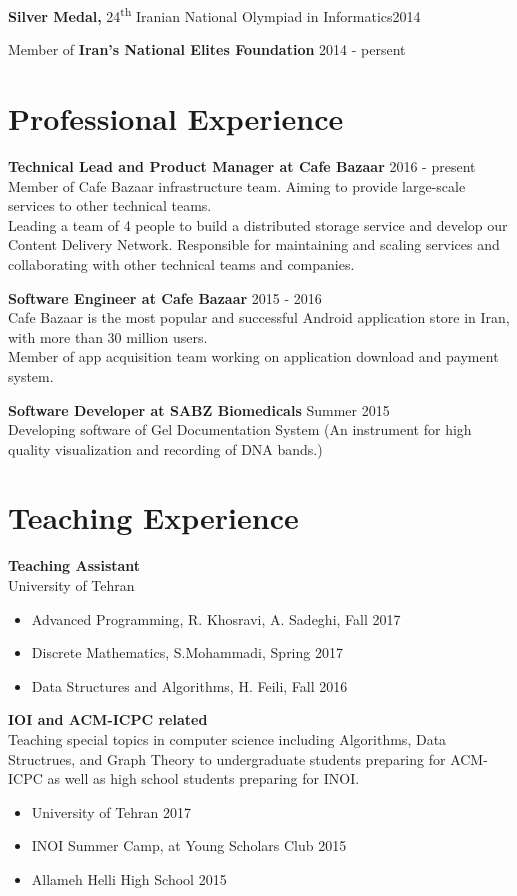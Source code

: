 \documentclass[margin]{res}
\begin{document}
\begin{resume}
    {\bf Silver Medal,} 24\textsuperscript{th} Iranian National Olympiad in Informatics\hfill 2014

    Member of {\bf Iran's National Elites Foundation} \hfill 2014 - persent

\section{Professional Experience}
    {\bf Technical Lead and Product Manager at Cafe Bazaar} \hfill 2016 - present
    \\ Member of Cafe Bazaar infrastructure team. Aiming to provide large-scale services to other technical teams. 
    \\Leading a team of 4 people to build a distributed storage service and develop our Content Delivery Network. Responsible for maintaining and scaling services and collaborating with other technical teams and companies.
    
    {\bf Software Engineer at Cafe Bazaar} \hfill 2015 - 2016
    \\ Cafe Bazaar is the most popular and successful Android application store in Iran, with more than 30 million users.
    \\ Member of app acquisition team working on application download and payment system.
    
    {\bf Software Developer at SABZ Biomedicals} \hfill Summer 2015
    \\Developing software of Gel Documentation System (An instrument for  high quality visualization and recording of DNA bands.)

\section{Teaching Experience}
	{\bf Teaching Assistant}
	\\University of Tehran
	\begin{itemize}
		\item Advanced Programming, R. Khosravi, A. Sadeghi, Fall 2017
		\item Discrete Mathematics, S.Mohammadi, Spring 2017
		\item Data Structures and Algorithms, H. Feili, Fall 2016
	\end{itemize}

    {\bf IOI and ACM-ICPC related}
    \\Teaching special topics in computer science including Algorithms, Data Structrues,
    and Graph Theory to undergraduate students preparing for ACM-ICPC as well as high school
    students preparing for INOI.
    	\begin{itemize}
		\item University of Tehran \hfill 2017
		\item INOI Summer Camp, at Young Scholars Club \hfill 2015
	    \item Allameh Helli High School \hfill 2015
	\end{itemize}


\end{resume}
\end{document}
